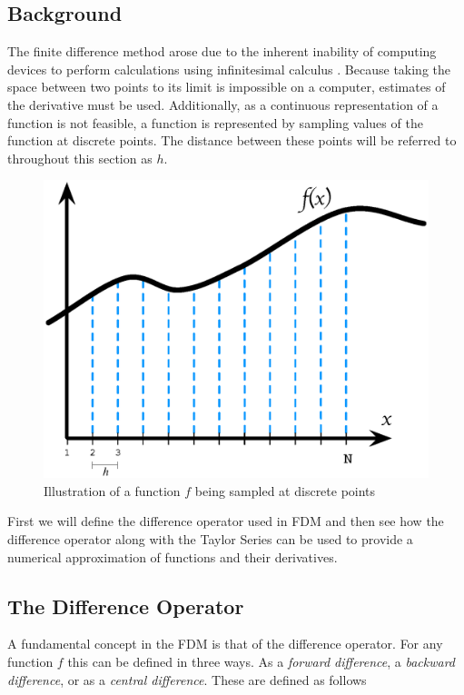 \documentclass[authoryearcitations]{UoYCSproject}
\begin{document}
\subsection{Background}
The finite difference method arose due to the inherent inability of computing devices to perform
calculations using infinitesimal calculus \cite{Hamming, zhilin}. Because taking the space
between two points to its limit is impossible on a computer, estimates of the derivative must be
used. Additionally, as a continuous representation of a function is not feasible, a function is represented
by sampling values of the function at discrete points. The distance between these points will
be referred to throughout this section as $h$. 


\begin{figure}[h]
  \centering
  \includegraphics[scale=0.5]{figures/sampledFunc3.eps}
    \caption{Illustration of a function $f$ being sampled at discrete points}
\end{figure}

First we will define the difference operator used in FDM and then see how the difference 
operator along with the Taylor Series can be used to provide a numerical approximation of 
functions and their derivatives. 

\subsection{The Difference Operator}
A fundamental concept in the FDM is that of the difference operator. For any function 
$f$ this can be defined in three ways. As a \emph{forward difference}, a \emph{backward difference},
or as a \emph{central difference}. These are defined as follows
\end{document}
